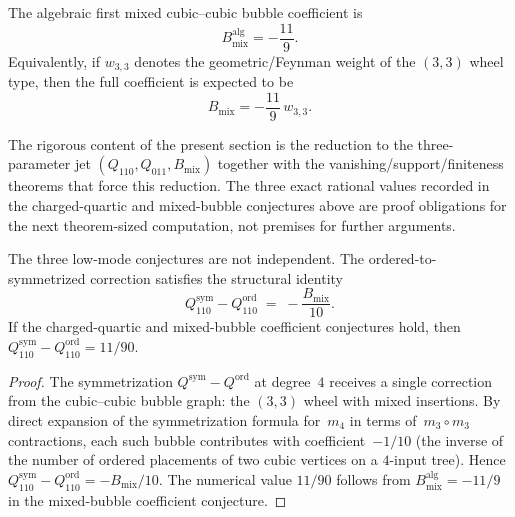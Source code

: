 \begin{conjecture}
The algebraic first mixed cubic--cubic bubble coefficient is
\[
B_{\mathrm{mix}}^{\mathrm{alg}}=-\frac{11}{9}.
\]
Equivalently, if $w_{3,3}$ denotes the geometric/Feynman weight of the $(3,3)$ wheel type,
then the full coefficient is expected to be
\[
B_{\mathrm{mix}}=-\frac{11}{9}\,w_{3,3}.
\]
\end{conjecture}

\begin{remark}
The rigorous content of the present section is the reduction to the three-parameter jet
$(Q_{110},Q_{011},B_{\mathrm{mix}})$ together with the vanishing/support/finiteness theorems that
force this reduction. The three exact rational values recorded in the
charged-quartic and mixed-bubble conjectures above are proof
obligations for the next theorem-sized computation, not premises for
further arguments.
\end{remark}

\begin{proposition}
The three low-mode conjectures are not independent.
The ordered-to-symmetrized correction satisfies the structural identity
\begin{equation}%
Q^{\mathrm{sym}}_{110} - Q^{\mathrm{ord}}_{110} \;=\; -\frac{B_{\mathrm{mix}}}{10}.
\end{equation}
If the charged-quartic and mixed-bubble coefficient conjectures hold, then
$Q^{\mathrm{sym}}_{110} - Q^{\mathrm{ord}}_{110} = 11/90$.
\end{proposition}

\begin{proof}
The symmetrization $Q^{\mathrm{sym}} - Q^{\mathrm{ord}}$ at
degree~$4$ receives a single correction from the cubic--cubic
bubble graph: the $(3,3)$ wheel with mixed insertions.
By direct expansion of the symmetrization formula for~$m_4$
in terms of~$m_3 \circ m_3$ contractions, each such bubble
contributes with coefficient~$-1/10$ (the inverse of the
number of ordered placements of two cubic vertices on a
$4$-input tree).
Hence
$Q^{\mathrm{sym}}_{110} - Q^{\mathrm{ord}}_{110}
= -B_{\mathrm{mix}}/10$.
The numerical value $11/90$ follows from
$B_{\mathrm{mix}}^{\mathrm{alg}} = -11/9$ in the mixed-bubble
coefficient conjecture.
\end{proof}

